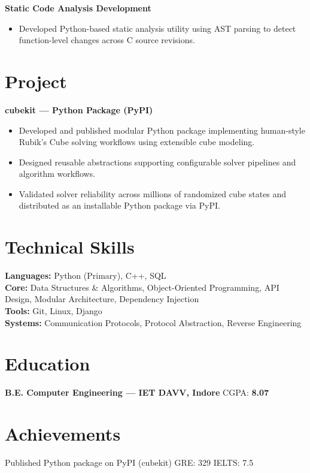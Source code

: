 \documentclass[a4paper,10pt]{article}
\begin{document}
\textbf{Static Code Analysis Development}

\begin{itemize}

\item Developed Python-based static analysis utility using AST parsing to detect function-level changes across C source revisions.

\end{itemize}


\section*{Project}

\textbf{cubekit — Python Package (PyPI)}

\begin{itemize}

\item Developed and published modular Python package implementing human-style Rubik's Cube solving workflows using extensible cube modeling.

\item Designed reusable abstractions supporting configurable solver pipelines and algorithm workflows.

\item Validated solver reliability across millions of randomized cube states and distributed as an installable Python package via PyPI.

\end{itemize}


\section*{Technical Skills}

\textbf{Languages:} Python (Primary), C++, SQL \\
\textbf{Core:} Data Structures \& Algorithms, Object-Oriented Programming, API Design, Modular Architecture, Dependency Injection \\
\textbf{Tools:} Git, Linux, Django \\
\textbf{Systems:} Communication Protocols, Protocol Abstraction, Reverse Engineering


\section*{Education}

\textbf{B.E. Computer Engineering — IET DAVV, Indore} \hfill CGPA: \textbf{8.07}


\section*{Achievements}

Published Python package on PyPI (cubekit) \textbar{} GRE: 329 \textbar{} IELTS: 7.5
\end{document}
